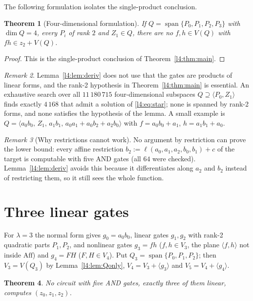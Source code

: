 \documentclass[11pt,a4paper]{article}
\theoremstyle{plain}
\newtheorem{theorem}{Theorem}
\theoremstyle{remark}
\newtheorem{remark}[theorem]{Remark}
\newcommand{\Aff}{\mathrm{Aff}}
\newcommand{\Span}{\operatorname{span}}
\begin{document}
The following formulation isolates the single-product conclusion.
\begin{theorem}[Four-dimensional formulation]\label{l3:thm:L4}
If $Q=\Span\{P_0,P_1,P_2,P_3\}$ with $\dim Q=4$, every $P_i$ of rank $2$ and $Z_1\in Q$, there are no $f,h\in V(Q)$ with $fh\in z_2+V(Q)$.
\end{theorem}
\begin{proof}This is the single-product conclusion of Theorem~\ref{l4:thm:main}.\end{proof}
\begin{remark}\label{l4:rem:rank2essential}
Lemma~\ref{l4:lem:deriv} does not use that the gates are products of linear forms, and the rank-2 hypothesis in Theorem~\ref{l4:thm:main} is essential. An exhaustive search over all $11\,180\,715$ four-dimensional subspaces $Q\supseteq\langle P_0,Z_1\rangle$ finds exactly $4\,168$ that admit a solution of \eqref{l4:eq:star}; none is spanned by rank-2 forms, and none satisfies the hypothesis of the lemma. A small example is $Q=\langle a_0b_0,\,Z_1,\,a_1b_1,\,a_0a_1+a_0b_2+a_2b_0\rangle$ with $f=a_0b_0+a_1$, $h=a_1b_1+a_0$.
\end{remark}

\begin{remark}[Why restrictions cannot work]\label{l4:rem:restrictions}
No argument by restriction can prove the lower bound: every affine restriction $b_2:=\ell(a_0,a_1,a_2,b_0,b_1)+c$ of the target is computable with five AND gates (all $64$ were checked). Lemma~\ref{l4:lem:deriv} avoids this because it differentiates along $a_2$ and $b_2$ instead of restricting them, so it still sees the whole function.
\end{remark}



\section{Three linear gates}\label{sec:lambda3}


For $\lambda=3$ the normal form gives $g_0=a_0b_0$, linear gates $g_1,g_2$ with rank-2 quadratic parts $P_1,P_2$, and nonlinear gates $g_3=fh$ ($f,h\in V_3$, the plane $\langle f,h\rangle$ not inside $\Aff$) and $g_4=FH$ ($F,H\in V_4$). Put $Q_3=\Span\{P_0,P_1,P_2\}$; then $V_3=V(Q_3)$ by Lemma~\ref{l4:lem:Qonly}, $V_4=V_3+\langle g_3\rangle$ and $V_5=V_4+\langle g_4\rangle$.

\begin{theorem}\label{l3:thm:main}
No circuit with five AND gates, exactly three of them linear, computes $(z_0,z_1,z_2)$.
\end{theorem}
\end{document}
